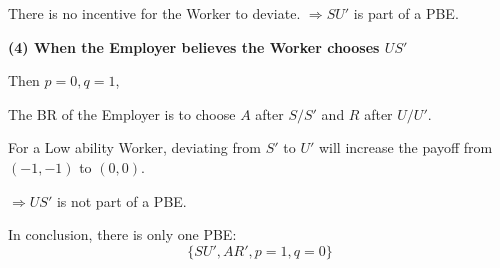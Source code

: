 \documentclass{article}
\begin{document}
\smallskip

There is no incentive for the Worker to deviate.
$\Rightarrow SU'$ is part of a PBE.

\medskip

\textbf{(4) When the Employer believes the Worker chooses $US'$}

\smallskip

Then $p=0,q=1$,

\smallskip

The BR of the Employer is to choose $A$ after $S/S'$ and $R$ after $U/U'$.

\smallskip

For a Low ability Worker, deviating from $S'$ to $U'$ will increase the payoff from
$(-1,-1)$ to $(0,0)$.

\smallskip

$\Rightarrow US'$ is not part of a PBE.

\medskip

In conclusion, there is only one PBE:
$$\{SU',AR',p=1,q=0\}$$
\end{document}

